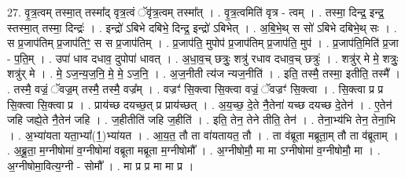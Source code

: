 \documentclass[17pt]{extarticle}
\begin{document}
27. वृ॒त्र॒त्वम् तस्मा॒त् तस्मा᳚द् वृत्र॒त्वं ॅवृ॑त्र॒त्वम् तस्मा᳚त् । . वृ॒त्र॒त्वमिति॑ वृत्र - त्वम् । . तस्मा॒ दिन्द्र॒ इन्द्र॒ स्तस्मा॒त् तस्मा॒ दिन्द्रः॑ । . इन्द्रो॑ ऽबिभे दबिभे॒ दिन्द्र॒ इन्द्रो॑ ऽबिभेत् । . अ॒बि॒भे॒थ् स सो॑ ऽबिभे दबिभे॒थ् सः । . स प्र॒जाप॑तिम् प्र॒जाप॑तिꣳ॒॒ स स प्र॒जाप॑तिम् । . प्र॒जाप॑ति॒ मुपोप॑ प्र॒जाप॑तिम् प्र॒जाप॑ति॒ मुप॑ । . प्र॒जाप॑ति॒मिति॑ प्र॒जा - प॒ति॒म् । . उपा॑ धाव दधाव॒ दुपोपा॑ धावत् । . अ॒धा॒व॒च् छत्रुः॒ शत्रु॑ रधाव दधाव॒च् छत्रुः॑ । . शत्रु॑र् मे मे॒ शत्रुः॒ शत्रु॑र् मे । . मे॒ ऽज॒न्य॒ज॒नि॒ मे॒ मे॒ ऽज॒नि॒ । . अ॒ज॒नीती त्य॑ज न्यज॒नीति॑ । . इति॒ तस्मै॒ तस्मा॒ इतीति॒ तस्मै᳚ । . तस्मै॒ वज्रं॒ ॅवज्र॒म् तस्मै॒ तस्मै॒ वज्र᳚म् । . वज्रꣳ॑ सि॒क्त्वा सि॒क्त्वा वज्रं॒ ॅवज्रꣳ॑ सि॒क्त्वा । . सि॒क्त्वा प्र प्र सि॒क्त्वा सि॒क्त्वा प्र । . प्राय॑च्छ दयच्छ॒त् प्र प्राय॑च्छत् । . अ॒य॒च्छ॒ दे॒ते नै॒तेना॑ यच्छ दयच्छ दे॒तेन॑ । . ए॒तेन॑ जहि जह्ये॒ते नै॒तेन॑ जहि । . ज॒हीतीति॑ जहि ज॒हीति॑ । . इति॒ तेन॒ तेने तीति॒ तेन॑ । . तेना॒भ्य॑भि तेन॒ तेना॒भि । . अ॒भ्या॑यता यता॒भ्या᳚(1॒)भ्या॑यत । . आ॒य॒त॒ तौ ता वा॑यतायत॒ तौ । . ता व॑ब्रूता मब्रूता॒म् तौ ता व॑ब्रूताम् । . अ॒ब्रू॒ता॒ म॒ग्नीषोमा॑ व॒ग्नीषोमा॑ वब्रूता मब्रूता म॒ग्नीषोमौ᳚ । . अ॒ग्नीषोमौ॒ मा मा ऽग्नीषोमा॑ व॒ग्नीषोमौ॒ मा । . अ॒ग्नीषोमा॒वित्य॒ग्नी - सोमौ᳚ । . मा प्र प्र मा मा प्र । \newline
\end{document}
